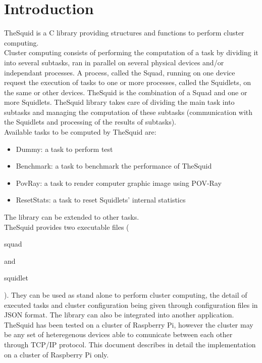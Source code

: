 \section*{Introduction}

TheSquid is a C library providing structures and functions to perform cluster computing.\\ 

Cluster computing consists of performing the computation of a task by dividing it into several subtasks, ran in parallel on several physical devices and/or independant processes. A process, called the Squad, running on one device request the execution of tasks to one or more processes, called the Squidlets, on the same or other devices. TheSquid is the combination of a Squad and one or more Squidlets. TheSquid library takes care of dividing the main task into subtasks and managing the computation of these subtasks (communication with the Squidlets and processing of the results of subtasks).\\

Available tasks to be computed by TheSquid are:
\begin{itemize}
\item Dummy: a task to perform test
\item Benchmark: a task to benchmark the performance of TheSquid
\item PovRay: a task to render computer graphic image using POV-Ray
\item ResetStats: a task to reset Squidlets' internal statistics
\end{itemize}
The library can be extended to other tasks.\\

TheSquid provides two executable files (\begin{ttfamily}squad\end{ttfamily} and \begin{ttfamily}squidlet\end{ttfamily}). They can be used as stand alone to perform cluster computing, the detail of executed tasks and cluster configuration being given through configuration files in JSON format. The library can also be integrated into another application.\\

TheSquid has been tested on a cluster of Raspberry Pi, however the cluster may be any set of heteregenous devices able to comunicate between each other through TCP/IP protocol. This document describes in detail the implementation on a cluster of Raspberry Pi only.\\

